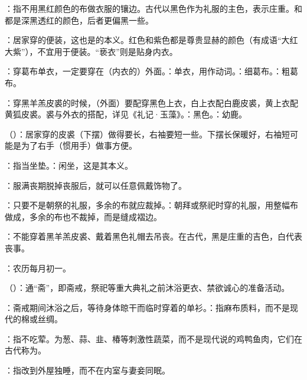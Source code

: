 {
\item {}：指不用黑红颜色的布做衣服的镶边。古代以黑色作为礼服的主色，表示庄重。和都是深黑透红的颜色，后者更偏黑一些。
\item {}：居家穿的便装，这也是的本义。红色和紫色都是尊贵显赫的颜色（有成语“大红大紫”），不宜用于便装。“亵衣”则是贴身内衣。
\item {}：穿葛布单衣，一定要穿在（内衣的）外面。：单衣，用作动词。：细葛布。：粗葛布。
\item {}：穿黑羊羔皮裘的时候，（外面）要配穿黑色上衣，白上衣配白鹿皮裘，黄上衣配黄狐皮裘。裘与外衣的搭配，详见《礼记·玉藻》。：黑色。：幼鹿。
\item {}（）：居家穿的皮裘（下摆）做得要长，右袖要短一些。下摆长保暖好，右袖短可能是为了右手（惯用手）做事方便。
\item {}：指当坐垫。：闲坐，这是其本义。
\item {}：服满丧期脱掉丧服后，就可以任意佩戴饰物了。
\item {}：只要不是朝祭的礼服，多余的布就应裁掉。：朝拜或祭祀时穿的礼服，用整幅布做成，多余的布也不裁掉，而是缝成褶边。
\item {}：不能穿着黑羊羔皮裘、戴着黑色礼帽去吊丧。在古代，黑是庄重的吉色，白代表丧事。
\item {}：农历每月初一。
}
{}


{
\item {}（）：通“斋”，即斋戒，祭祀等重大典礼之前沐浴更衣、禁欲诚心的准备活动。
\item {}：斋戒期间沐浴之后，等待身体晾干而临时穿着的单衫。：指麻布质料，而不是现代的棉或丝绸。
\item {}：指不吃荤。为葱、蒜、韭、椿等刺激性蔬菜，而不是现代说的鸡鸭鱼肉，它们在古代称为。%
\item {}：指改到外屋独睡，而不在内室与妻妾同眠。
}
{}


